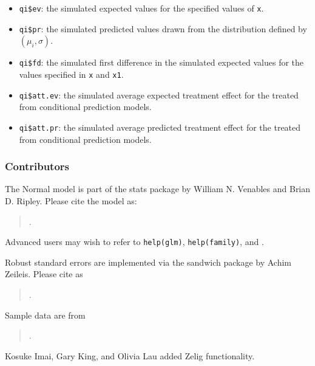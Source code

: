 \begin{itemize}
   \begin{itemize}
   \item {\tt qi\$ev}: the simulated expected values for the specified
     values of {\tt x}.
   \item {\tt qi\$pr}: the simulated predicted values drawn from the
     distribution defined by $(\mu_i, \sigma)$.
   \item {\tt qi\$fd}: the simulated first difference in the simulated
     expected values for the values specified in {\tt x} and {\tt x1}.
   \item {\tt qi\$att.ev}: the simulated average expected treatment
     effect for the treated from conditional prediction models.  
   \item {\tt qi\$att.pr}: the simulated average predicted treatment
     effect for the treated from conditional prediction models.  
   \end{itemize}
\end{itemize}

\subsubsection{Contributors}

The Normal model is part of the stats package by William N. Venables
and Brian D. Ripley.  Please cite the model as:
\begin{verse}
.
\end{verse}

Advanced users may wish to refer to
\texttt{help(glm)}, \texttt{help(family)}, and \cite{McCNel89}.

Robust standard errors are implemented via the sandwich package
by Achim Zeileis.  Please cite as
\begin{verse}
.
\end{verse}

Sample data are from 
\begin{verse}
.  
\end{verse}

Kosuke Imai, Gary King, and Olivia Lau added Zelig functionality.  















